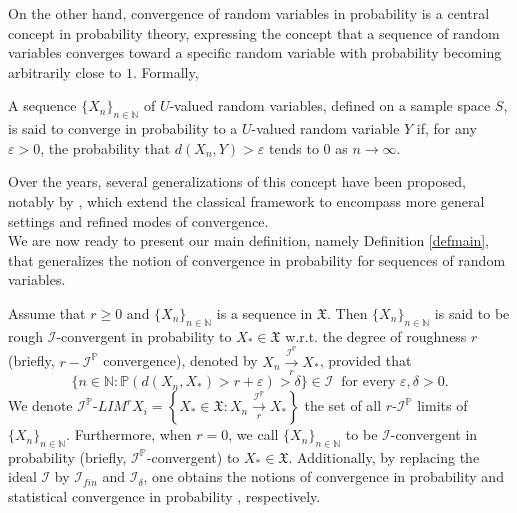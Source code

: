 \documentclass[reqno]{amsart}
\begin{document}
 
 On the other hand, convergence of random variables in probability is a central concept in probability theory, expressing the concept that a sequence of random variables converges toward a specific random variable with probability becoming arbitrarily close to $1$. Formally,
\begin{definition}\cite{rachev2013methods,resnick2003probability}
	A sequence $\{X_n\}_{n\in\mathbb{N}}$ of $U$-valued random variables, defined on a sample space $S$, 
	is said to converge in probability to a $U$-valued random variable $Y$ if, for any 
	$\varepsilon>0$, the probability that $d(X_n,Y)>\varepsilon$ tends to $0$ as $n\to\infty$.
\end{definition}
Over the years, several generalizations of this concept have been proposed, notably by \cite{ghosal2013statistical,jena2020various, rambaud2011note,csenccimen2013statistical,csenccimen2008strong,csenccimen2016exhaustive}, which extend the classical framework to encompass more general settings and refined modes of convergence.\\


We are now ready to present our main definition, namely Definition \ref{defmain}, that generalizes the notion of convergence in probability for sequences of random variables.
	\begin{definition}\label{defmain}
		Assume that $r\geq 0$ and $\{X_n\}_{n\in\mathbb{N}}$ is a sequence in $\mathfrak{X}$. Then $\{X_n\}_{n\in\mathbb{N}}$ is said to be rough $\mathcal{I}$-convergent in probability to $X_*\in\mathfrak{X}$ w.r.t. the degree of roughness $r$ (briefly, $r-\mathcal{I}^{\mathbb{P}}$ convergence), denoted by $X_n\xrightarrow[r]{\mathcal{I}^{\mathbb{P}}} X_*$, provided that
		$$\{n\in\mathbb{N}:\mathbb{P}(d(X_n,X_*)> r+\varepsilon)>\delta\}\in\mathcal{I}~\mbox{ for every $\varepsilon,\delta > 0$}.$$ 
		We denote $\mathcal{I}^{\mathbb{P}}$-$LIM^rX_i=\left\{X_*\in \mathfrak{X}:X_n\xrightarrow[r]{\mathcal{I}^{\mathbb{P}}} X_* \right\}$ the set of all $r$-$\mathcal{I}^{\mathbb{P}}$ limits of $\{X_n\}_{n\in\mathbb{N}}$.  Furthermore, when $r=0$, we call $\{X_n\}_{n\in\mathbb{N}}$ to be $\mathcal{I}$-convergent in probability (briefly, $\mathcal{I}^{\mathbb{P}}$-convergent) to $X_*\in\mathfrak{X}$. Additionally, by replacing the ideal $\mathcal{I}$ by $\mathcal{I}_{fin}$ and $\mathcal{I}_{\delta}$, one obtains the notions of convergence in probability \cite{resnick2003probability} and statistical convergence in probability \cite{ghosal2013statistical}, respectively.
	\end{definition}
	
\end{document}
